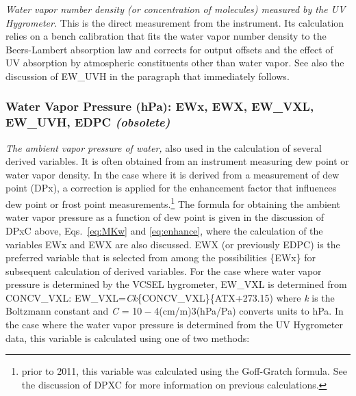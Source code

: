 \documentclass[
]{book}
\begin{document}
\emph{Water vapor number density (or concentration of molecules) measured by the UV Hygrometer.} This is the direct measurement from the instrument. Its calculation relies on a bench calibration that fits the water vapor number density to the Beers-Lambert absorption law and corrects for output offsets and the effect of UV absorption by atmospheric constituents other than water vapor. See also the discussion of EW\_UVH in the paragraph that immediately follows.

\hypertarget{ewx}{%
\subsubsection*{\texorpdfstring{Water Vapor Pressure (hPa): EWx, EWX, EW\_VXL, EW\_UVH, EDPC \emph{(obsolete)}}{Water Vapor Pressure (hPa): EWx, EWX, EW\_VXL, EW\_UVH, EDPC (obsolete)}}\label{ewx}}

\emph{The ambient vapor pressure of water,} also used in the calculation of several derived variables. It is often obtained from an instrument measuring dew point or water vapor density. In the case where it is derived from a measurement of dew point (DPx), a correction is applied for the enhancement factor that influences dew point or frost point measurements.\footnote{prior to 2011, this variable was calculated using the Goff-Gratch formula. See the discussion of DPXC for more information on previous calculations.}
The formula for obtaining the ambient water vapor pressure as a function of dew point is given in the discussion of DPxC above, Eqs.~\eqref{eq:MKw} and \eqref{eq:enhance}, where the calculation of the variables EWx and EWX are also discussed. EWX (or previously EDPC) is the preferred variable that is selected from among the possibilities \{EWx\} for subsequent calculation of derived variables.
For the case where water vapor pressure is determined by the VCSEL hygrometer, EW\_VXL is determined from CONCV\_VXL: EW\_VXL={\emph{C}}{\emph{k}}\{CONCV\_VXL\}\{ATX+273.15) where {\emph{k}} is the Boltzmann constant and {\emph{C} = 10 − 4}(cm/m){3}(hPa/Pa) converts units to hPa.
In the case where the water vapor pressure is determined from the UV Hygrometer data, this variable is calculated using one of two methods:
\end{document}
